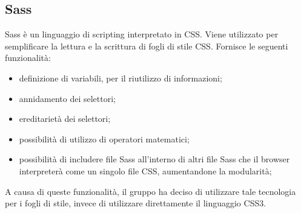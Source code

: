 \subsection{Sass}
Sass è un linguaggio di scripting interpretato in CSS. Viene utilizzato per semplificare la lettura e la scrittura di fogli di stile CSS. Fornisce le seguenti funzionalità:

\begin{itemize}

\item definizione di variabili, per il riutilizzo di informazioni;

\item annidamento dei selettori;

\item ereditarietà dei selettori;

\item possibilità di utilizzo di operatori matematici;

\item possibilità di includere file Sass all'interno di altri file Sass che il browser interpreterà come un singolo file CSS, aumentandone la modularità;

\end{itemize}

A causa di queste funzionalità, il gruppo ha deciso di utilizzare tale tecnologia per i fogli di stile, invece di utilizzare direttamente il linguaggio CSS3.
